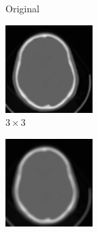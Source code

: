 \documentclass[11pt,twocolumn,twoside]{opticajnl}
\begin{document}
\begin{figure}[h]
\begin{subfigure}[h]{0.24\linewidth}
            \caption{Original} 
         \end{subfigure}
         \begin{subfigure}[h]{0.24\linewidth}
            \centering
            \includegraphics[width=\textwidth]{Figuras/ImagenC3x3.png}
            \caption{$3\times3$} 
         \end{subfigure}
         \begin{subfigure}[h]{0.24\linewidth}
            \centering
            \includegraphics[width=\textwidth]{Figuras/ImagenC5x5.png}

\end{subfigure}
\end{figure}
\end{document}
